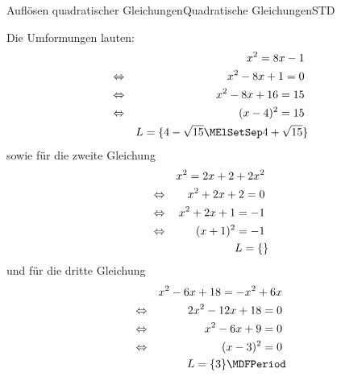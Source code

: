 \begin{MXContent}{Auflösen quadratischer Gleichungen}{Quadratische Gleichungen}{STD}
\begin{MExercise}
\begin{MHint}{\iSolution}
Die Umformungen lauten:
\begin{eqnarray*}
&&x^2=8x-1 \ \\
&\Leftrightarrow&x^2-8x+1=0 \ \\
&\Leftrightarrow&x^2-8x+16=15 \ \\
&\Leftrightarrow&(x-4)^2=15 \ \\
&& \ML=\lbrace 4-\sqrt{15}\MElSetSep 4+\sqrt{15}\rbrace
\end{eqnarray*}
sowie für die zweite Gleichung
\begin{eqnarray*}
&&x^2=2x+2+2x^2 \ \\
&\Leftrightarrow&x^2+2x+2=0 \ \\
&\Leftrightarrow&x^2+2x+1=-1 \ \\
&\Leftrightarrow&(x+1)^2=-1\ \\
&& L=\lbrace\rbrace
\end{eqnarray*}
und für die dritte Gleichung
\begin{eqnarray*}
&&x^2-6x+18=-x^2+6x \ \\
&\Leftrightarrow&2x^2-12x+18=0 \ \\
&\Leftrightarrow&x^2-6x+9=0 \ \\
&\Leftrightarrow&(x-3)^2=0\ \\
&& \ML=\lbrace3\rbrace \MDFPeriod
\end{eqnarray*}
\end{MHint}

\end{MExercise}

\end{MXContent}




